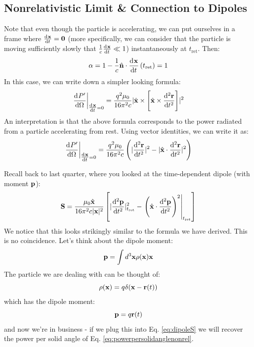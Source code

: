 \subsection{Nonrelativistic Limit \& Connection to Dipoles}
Note that even though the particle is accelerating, we can put ourselves in a frame where $\od{\v{x}}{t} = \v{0}$ (more specifically, we can consider that the particle is moving sufficiently slowly that $\frac{1}{c}\od{\v{x}}{t} \ll 1$) instantaneously at $t_{\text{ret}}$. Then:
\begin{equation}
    \alpha = 1 - \frac{1}{c}\hat{\v{n}}\cdot\dod{\v{x}}{t}(t_{\text{ret}}) = 1
\end{equation}
In this case, we can write down a simpler looking formula:
\begin{equation}
    \left.\dod{P'}{\Omega}\right|_{\od{\v{x}}{t}=0} = \frac{q^2\mu_0}{16\pi^2c}\abs{\hat{\v{x}}\times\left[\hat{\v{x}} \times \dod[2]{\v{r}}{t}\right]}^2
\end{equation}
An interpretation is that the above formula corresponds to the power radiated from a particle accelerating from rest. Using vector identities, we can write it as:
\begin{equation}\label{eq:powerpersolidanglenonrel}
    \left.\dod{P'}{\Omega}\right|_{\od{\v{x}}{t}=0} = \frac{q^2\mu_0}{16\pi^2c}\left(\abs{\dod[2]{\v{r}}{t}}^2 - \abs{\hat{\v{x}} \cdot \dod[2]{\v{r}}{t}}^2\right)
\end{equation}

Recall back to last quarter, where you looked at the time-dependent dipole (with moment $\mathbf{p}$):
\begin{equation}\label{eq:dipoleS}
    \v{S} = \frac{\mu_0\hat{\v{x}}}{16\pi^2 c\abs{\v{x}}^2}\left[\abs{\dod[2]{\v{p}}{t}}_{t_{\text{ret}}}^2 - \left.\left(\hat{\v{x}} \cdot \dod[2]{\v{p}}{t}\right)^2\right|_{t_{\text{ret}}} \right]
\end{equation}
We notice that this looks strikingly similar to the formula we have derived. This is no coincidence. Let's think about the dipole moment:
\begin{equation}
    \mathbf{p} = \int d^3\mathbf{x}\rho(\mathbf{x})\mathbf{x}
\end{equation}
The particle we are dealing with can be thought of:
\begin{equation}
    \rho(\mathbf{x}) = q\delta(\mathbf{x} - \mathbf{r}(t))
\end{equation}
which has the dipole moment:
\begin{equation}
    \mathbf{p} = q\mathbf{r}(t)
\end{equation}
and now we're in business - if we plug this into Eq. \eqref{eq:dipoleS} we will recover the power per solid angle of Eq. \eqref{eq:powerpersolidanglenonrel}.

